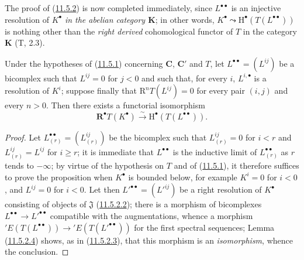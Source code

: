 \begin{env}[11.5.2.5]
\label{0.11.5.2.5}
The proof of (\hyperref[0.11.5.2]{11.5.2}) is now completed
immediately, since $L^{\bullet\bullet}$ is an injective resolution of
$K^\bullet$ \emph{in the abelian category $\boldsymbol{K}$}; in other words,
$K^\bullet\leadsto\mathrm H^\bullet(T(L^{\bullet\bullet}))$ is nothing other than
the \emph{right derived} cohomological functor of $T$ in the category $\boldsymbol{K}$
(T, 2.3).
\end{env}

\begin{proposition}[11.5.3]
\label{0.11.5.3}
Under the hypotheses of \textup{(\hyperref[0.11.5.1]{11.5.1})} concerning
$\boldsymbol{C}$, $\boldsymbol{C}'$ and $T$, let
$L^{\bullet\bullet}=(L^{ij})$ be a bicomplex such that $L^{ij}=0$ for $j<0$ and
such that, for every $i$, $L^{i,\bullet}$ is a resolution of $K^i$; suppose
finally that $\mathrm R^nT(L^{ij})=0$ for every pair $(i,j)$ and every $n>0$.
Then there exists a functorial isomorphism
\[
  \label{0.11.5.3.1}
  \mathbf R^\bullet T(K^\bullet)\xrightarrow{\sim}
  \mathrm H^\bullet(T(L^{\bullet\bullet})).
  \tag{11.5.3.1}
\]
\end{proposition}

\begin{proof}
Let $L_{(r)}^{\bullet\bullet}=(L_{(r)}^{ij})$ be the bicomplex such that
$L_{(r)}^{ij}=0$ for $i<r$ and $L_{(r)}^{ij}=L^{ij}$ for $i\geq r$; it is
immediate that $L^{\bullet\bullet}$ is the inductive limit of
$L_{(r)}^{\bullet\bullet}$ as $r$ tends to $-\infty$; by virtue of
the hypothesis on $T$ and of (\hyperref[0.11.5.1]{11.5.1}), it therefore suffices to
prove the proposition when $K^\bullet$ is bounded below, for
example $K^i=0$ for $i<0$, and $L^{ij}=0$ for $i<0$. Let then
$L'^{\bullet\bullet}=(L'^{ij})$ be a right resolution of $K^\bullet$ consisting
of objects of $\mathfrak J$ (\hyperref[0.11.5.2.2]{11.5.2.2}); there is a
morphism of bicomplexes
$L^{\bullet\bullet}\to L'^{\bullet\bullet}$ compatible with the
augmentations, whence a morphism
$'E(T(L^{\bullet\bullet}))\to{}'E(T(L'^{\bullet\bullet}))$ for the first
spectral sequences; Lemma (\hyperref[0.11.5.2.4]{11.5.2.4}) shows,
as in (\hyperref[0.11.5.2.3]{11.5.2.3}), that this morphism is an
\emph{isomorphism}, whence the conclusion.
\end{proof}

